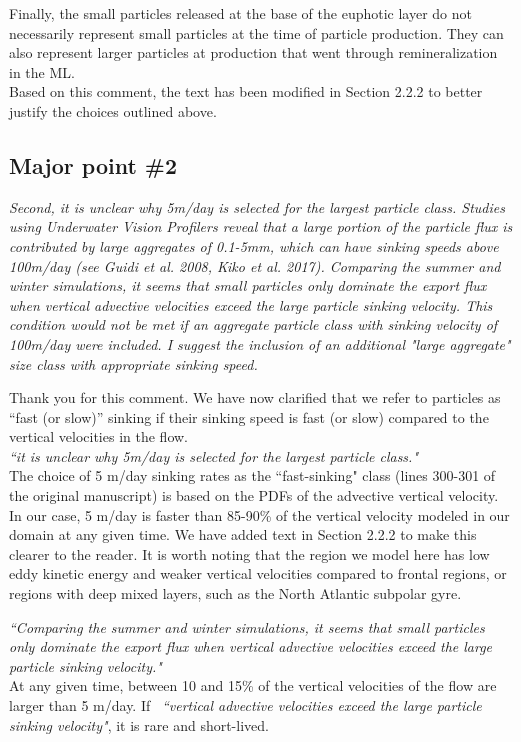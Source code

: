 \documentclass[12pt,letter]{article}
\begin{document}
{Finally, the small particles released at the base of the euphotic layer do not necessarily represent small particles at the time of particle production. They can also represent larger particles at production that went through remineralization in the ML.\\


Based on this comment, the text has been modified in Section 2.2.2 to better justify the choices outlined above.}

\subsection*{Major point \#2}
\textit{Second, it is unclear why 5m/day is selected for the largest particle class. Studies using Underwater Vision Profilers reveal that a large portion of the particle flux is contributed by large aggregates of 0.1-5mm, which can have sinking speeds above 100m/day (see Guidi et al. 2008, Kiko et al. 2017). Comparing the summer and winter simulations, it seems that small particles only dominate the export flux when vertical advective velocities exceed the large particle sinking velocity. This condition would not be met if an aggregate particle class with sinking velocity of 100m/day were included. I suggest the inclusion of an additional "large aggregate" size class with appropriate sinking speed.\\}

{\color{blue}Thank you for this comment. We have now clarified that we refer to particles as ``fast (or slow)'' sinking if their sinking speed is fast (or slow) compared to the vertical velocities in the flow.} \\

\textit{``it is unclear why 5m/day is selected for the largest particle class."\\}
{\color{blue}
	The choice of 5 m/day sinking rates as the ``fast-sinking"  class (lines 300-301 of the original manuscript) is based on the PDFs of the advective vertical velocity. In our case, 5 m/day is faster than 85-90\% of the vertical velocity modeled in our domain at any given time. We have added text in Section 2.2.2 to make this clearer to the reader. It is worth noting that the region we model here has low eddy kinetic energy and weaker vertical velocities compared to frontal regions, or regions with deep mixed layers, such as the North Atlantic subpolar gyre.\\}

\textit{``Comparing the summer and winter simulations, it seems that small particles only dominate the export flux when vertical advective velocities exceed the large particle sinking velocity."\\}
{\color{blue}
 At any given time, between 10 and 15\% of the vertical velocities of the flow are larger than 5 m/day.
 If  }\textit{``vertical advective velocities exceed the large particle sinking velocity"}{\color{blue}, it is rare and short-lived.\\}
\end{document}
